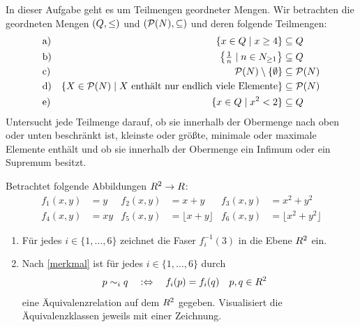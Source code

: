 \begin{aufg}[Schranken (L)] \label{aufg:schranken}
    In dieser Aufgabe geht es um Teilmengen geordneter Mengen. Wir betrachten die geordneten Mengen $(\relax Q,\le)$ und $(\mathcal P(\relax N),\subseteq)$ und deren folgende Teilmengen:
    \begin{align*}
        & \text{a)} & \{x\in \relax Q \mid x\ge 4\} & \subseteq \relax Q \\
        & \text{b)} & \left\{\tfrac{1}{n}\mid n\in \relax N_{\ge 1}\right\} & \subseteq \relax Q \\
        & \text{c)} & \mathcal P(\relax N)\setminus \{\emptyset\} & \subseteq \mathcal P(\relax N) \\
        & \text{d)} & \{X\in\mathcal P(\relax N)\mid X\ \text{enthält nur endlich viele Elemente}\} & \subseteq \mathcal P(\relax N) \\
        & \text{e)} & \{x\in \relax Q \mid x^2<2\} & \subseteq \relax Q
    \end{align*}
    Untersucht jede Teilmenge darauf, ob sie innerhalb der Obermenge nach oben oder unten beschränkt ist, kleinste oder größte, minimale oder maximale Elemente enthält und ob sie innerhalb der Obermenge ein Infimum oder ein Supremum besitzt.
\end{aufg}


\begin{aufg}
    Betrachtet folgende Abbildungen $\relax R^2\to \relax R$:
    \begin{align*}
        f_1(x,y) & = y     & f_2(x,y) & = x+y                    & f_3(x,y) & = x^2+y^2 \\
        f_4(x,y) & = xy    & f_5(x,y) & = \lfloor x + y\rfloor   & f_6(x,y) & = \lfloor x^2+y^2\rfloor
    \end{align*}
    \begin{enumerate}
        \item Für jedes $i\in\{1,\dots , 6\}$ zeichnet die Faser $f_i^{-1}(3)$ in die Ebene $\relax R^2$ ein.
        \item Nach \cref{merkmal} ist für jedes $i\in\{1,\dots , 6\}$ durch
        \begin{align*}
            p\sim_i q \quad &:\Leftrightarrow\quad f_i(p)=f_i(q) && p,q\in \relax R^2
        \end{align*}
        eine Äquivalenzrelation auf dem $\relax R^2$ gegeben. Visualisiert die Äquivalenzklassen jeweils mit einer Zeichnung.
    \end{enumerate}
\end{aufg}

